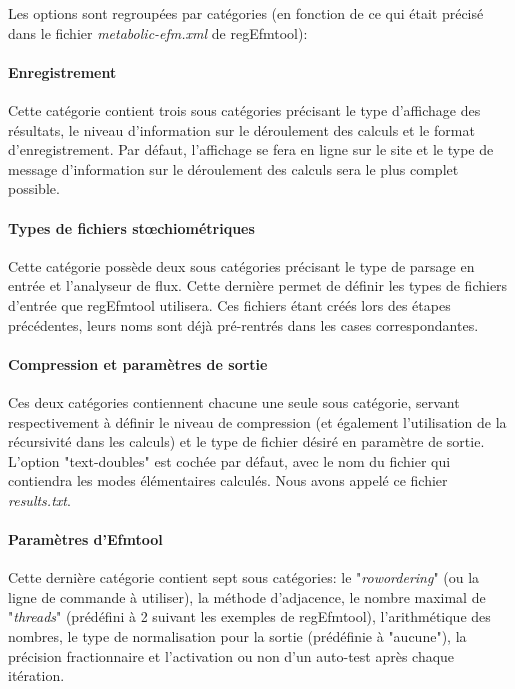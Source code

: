 Les options sont regroupées par catégories (en fonction de ce qui était précisé dans le fichier \textit{metabolic-efm.xml} de regEfmtool):

\paragraph*{Enregistrement} Cette catégorie contient trois sous catégories précisant le type d'affichage des résultats, le niveau d'information sur le déroulement des calculs et le format d'enregistrement. Par défaut, l'affichage se fera en ligne sur le site et le type de message d'information sur le déroulement des calculs sera le plus complet possible. 

\paragraph*{Types de fichiers stœchiométriques} Cette catégorie possède deux sous catégories précisant le type de parsage en entrée et l'analyseur de flux. Cette dernière permet de définir les types de fichiers d'entrée que regEfmtool utilisera. Ces fichiers étant créés lors des étapes précédentes, leurs noms sont déjà pré-rentrés dans les cases correspondantes.

\paragraph*{Compression et paramètres de sortie} Ces deux catégories contiennent chacune une seule sous catégorie, servant respectivement à définir le niveau de compression (et également l'utilisation de la récursivité dans les calculs) et le type de fichier désiré en paramètre de sortie. L'option "text-doubles" est cochée par défaut, avec le nom du fichier qui contiendra les modes élémentaires calculés. Nous avons appelé ce fichier \textit{results.txt}. 

\paragraph*{Paramètres d'Efmtool} Cette dernière catégorie contient sept sous catégories: le "\textit{rowordering}" (ou la ligne de commande à utiliser), la méthode d'adjacence, le nombre maximal de "\textit{threads}" (prédéfini à 2 suivant les exemples de regEfmtool), l'arithmétique des nombres, le type de normalisation pour la sortie (prédéfinie à "aucune"), la précision fractionnaire et l'activation ou non d'un auto-test après chaque itération. \\


